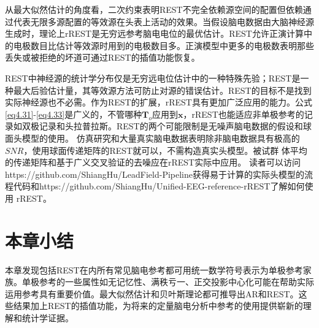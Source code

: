 从最大似然估计的角度看，二次约束表明REST不完全依赖源空间的配置但依赖通过代表无限多源配置的等效源在头表上活动的效果。当假设脑电数据由大脑神经源生成时，理论上rREST是无穷远参考脑电电位的最优估计。REST允许正演计算中的电极数目比估计等效源时用到的电极数目多。正演模型中更多的电极数表明那些丢失或被拒绝的坏道可通过REST的插值功能恢复。

REST中神经源的统计学分布仅是无穷远电位估计中的一种特殊先验；REST是一种最大后验估计量，其等效源方法可防止对源的错误估计。REST的目标不是找到实际神经源也不必需。作为REST的扩展，rREST具有更加广泛应用的能力。公式 \eqref{eq4.31}-\eqref{eq4.33}是广义的，不管哪种$\mathbf{T}_o$应用到$\mathbf{x}$，rREST也能适应非单极参考的记录如双极记录和头拉普拉斯。REST的两个可能限制是无噪声脑电数据的假设和球
面头模型的使用。 仿真研究和大量真实脑电数据表明除非脑电数据具有极高的$SNR$，使用球面传递矩阵的REST就可以，不需构造真实头模型。被试群
体平均的传递矩阵和基于广义交叉验证的去噪应在rREST实际中应用。 读者可以访问https://github.com/ShiangHu/LeadField-Pipeline获得易于计算的实际头模型的流程代码和https://github.com/ShiangHu/Unified-EEG-reference-rREST了解如何使用
rREST。
\section{本章小结}
本章发现包括REST在内所有常见脑电参考都可用统一数学符号表示为单极参考家族。单极参考的一些属性如无记忆性、满秩亏一、正交投影中心化可能在帮助实际运用参考具有重要价值。最大似然估计和贝叶斯理论都可推导出AR和REST。这些结果加上REST的插值功能，为将来的定量脑电分析中参考的使用提供崭新的理解和统计学证据。